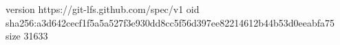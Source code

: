 version https://git-lfs.github.com/spec/v1
oid sha256:a3d642cecf1f5a5a527f3e930dd8cc5f56d397ee82214612b44b53d0eeabfa75
size 31633

